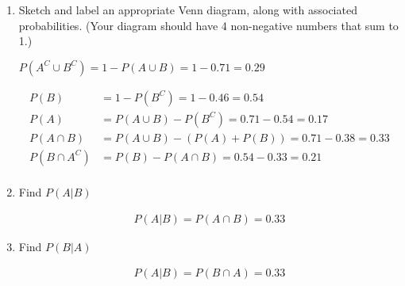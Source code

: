     \begin{enumerate}[label=(\alph*)]
        \item Sketch and label an appropriate Venn diagram, along with associated probabilities. (Your diagram should have 4 non-negative numbers that sum to 1.)
        
        \begin{mdframed}
            \centering
            $P(A^C \cup B^C) = 1 - P(A \cup B) = 1 - 0.71 = 0.29$

                \begin{align*}
                    P(B) & = 1 - P(B^C) = 1 - 0.46 = 0.54 \\
                    P(A) & = P(A \cup B) - P(B^C) = 0.71 - 0.54 = 0.17  \\
                    P(A \cap B) & = P(A \cup B) - (P(A) + P(B)) = 0.71 - 0.38 = 0.33  \\
                    P(B \cap A^C) & = P(B) - P(A \cap B) = 0.54- 0.33 = 0.21 \\
                \end{align*}

        \end{mdframed}

        \item Find $P(A|B)$

            \begin{mdframed}
                \begin{equation*}
                    \begin{gathered}
                        P(A|B) = P(A \cap B) =  \boxed{0.33}
                    \end{gathered}
                  \end{equation*}    
            \end{mdframed}
              
        \item Find $P(B|A)$
        
            \begin{mdframed}
                \begin{equation*}
                    \begin{gathered}
                        P(A|B) = P(B \cap A) =  \boxed{0.33}
                    \end{gathered}
                \end{equation*}    
            \end{mdframed}


\end{enumerate}
